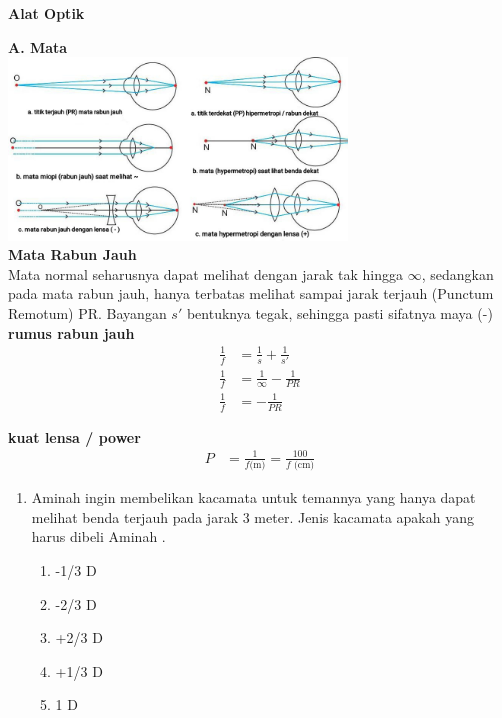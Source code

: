 \documentclass[10pt,a4paper]{extarticle}
\newcommand{\pilgani}[1]{                            \vspace{-0.3cm}\begin{multicols}{2}
 \begin{enumerate}[label=\Alph*., itemsep=0pt,topsep=0pt,leftmargin=*,align=Center]#1                     \end{enumerate}
 \phantom{ini cuma sapi, wedus, dan ayam}
 \end{multicols}}
\begin{document}
 \textbf{Alat Optik} \phantom{ini nama siswa yang aaamengerjakan soal kuis ini }  

\begin{multicols*}{2}\raggedcolumns
\textbf{A. Mata}\\
\includegraphics[width=9cm]{pic/mata} \\
\textbf{Mata Rabun Jauh}\\
Mata normal seharusnya dapat melihat dengan jarak tak hingga $\infty$, sedangkan pada mata rabun jauh, hanya terbatas melihat sampai jarak terjauh (Punctum Remotum) PR. Bayangan $s'$ bentuknya tegak, sehingga pasti sifatnya maya (-)\\
\vspace{0.7cm}
\textbf{rumus rabun jauh}
\vspace{-0.7cm}
\begin{align*}
\frac{1}{f} &= \frac{1}{s}+\frac{1}{s'}\\
\frac{1}{f} &= \frac{1}{\infty} -\frac{1}{PR}\\
\frac{1}{f} &= -\frac{1}{PR}
\end{align*}


\textbf{kuat lensa / power }
\begin{align*}
P &= \frac{1 }{f\text{(m)}}=\frac{100}{f\text{ (cm)}}
\end{align*}
\vspace{0.8cm}

\begin{enumerate}

\item Aminah ingin membelikan kacamata untuk temannya yang hanya dapat melihat benda terjauh pada jarak 3 meter. Jenis kacamata apakah yang harus dibeli Aminah .
\pilgani{
	\item -1/3 D
	\item -2/3 D
	\item +2/3 D
	\item +1/3 D
	\item 1 D }
\vspace{3cm}


\end{enumerate}
\end{multicols*}
\end{document}
